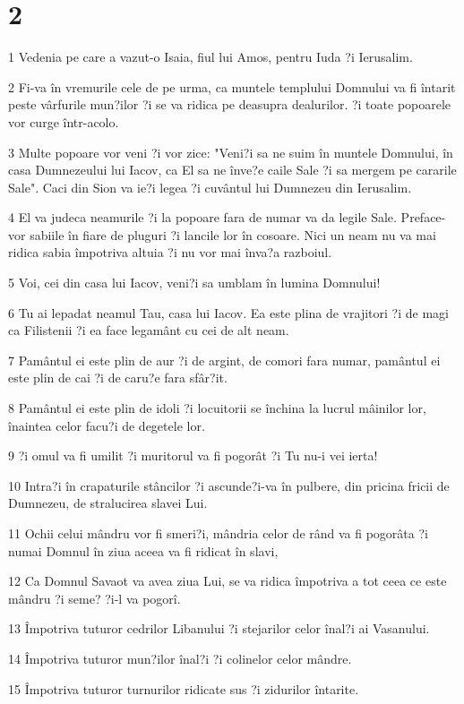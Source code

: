 \chapter{2}

\par 1 Vedenia pe care a vazut-o Isaia, fiul lui Amos, pentru Iuda ?i Ierusalim.
\par 2 Fi-va în vremurile cele de pe urma, ca muntele templului Domnului va fi întarit peste vârfurile mun?ilor ?i se va ridica pe deasupra dealurilor. ?i toate popoarele vor curge într-acolo.
\par 3 Multe popoare vor veni ?i vor zice: "Veni?i sa ne suim în muntele Domnului, în casa Dumnezeului lui Iacov, ca El sa ne înve?e caile Sale ?i sa mergem pe cararile Sale". Caci din Sion va ie?i legea ?i cuvântul lui Dumnezeu din Ierusalim.
\par 4 El va judeca neamurile ?i la popoare fara de numar va da legile Sale. Preface-vor sabiile în fiare de pluguri ?i lancile lor în cosoare. Nici un neam nu va mai ridica sabia împotriva altuia ?i nu vor mai înva?a razboiul.
\par 5 Voi, cei din casa lui Iacov, veni?i sa umblam în lumina Domnului!
\par 6 Tu ai lepadat neamul Tau, casa lui Iacov. Ea este plina de vrajitori ?i de magi ca Filistenii ?i ea face legamânt cu cei de alt neam.
\par 7 Pamântul ei este plin de aur ?i de argint, de comori fara numar, pamântul ei este plin de cai ?i de caru?e fara sfâr?it.
\par 8 Pamântul ei este plin de idoli ?i locuitorii se închina la lucrul mâinilor lor, înaintea celor facu?i de degetele lor.
\par 9 ?i omul va fi umilit ?i muritorul va fi pogorât ?i Tu nu-i vei ierta!
\par 10 Intra?i în crapaturile stâncilor ?i ascunde?i-va în pulbere, din pricina fricii de Dumnezeu, de stralucirea slavei Lui.
\par 11 Ochii celui mândru vor fi smeri?i, mândria celor de rând va fi pogorâta ?i numai Domnul în ziua aceea va fi ridicat în slavi,
\par 12 Ca Domnul Savaot va avea ziua Lui, se va ridica împotriva a tot ceea ce este mândru ?i seme? ?i-l va pogorî.
\par 13 Împotriva tuturor cedrilor Libanului ?i stejarilor celor înal?i ai Vasanului.
\par 14 Împotriva tuturor mun?ilor înal?i ?i colinelor celor mândre.
\par 15 Împotriva tuturor turnurilor ridicate sus ?i zidurilor întarite.
